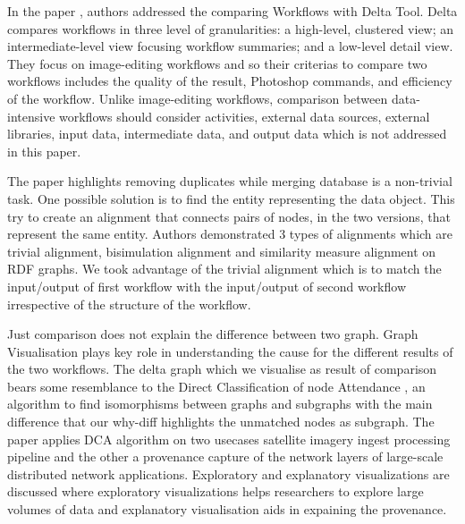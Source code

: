 \documentclass[10pt,conference,twocolumn]{IEEEtran}
\begin{document}
In the paper \cite{Kong2012}, authors addressed the comparing Workflows with Delta Tool. Delta compares workflows in three level of granularities: a high-level, clustered view; an intermediate-level view focusing workflow summaries; and a low-level detail view. They focus on image-editing workflows and so their criterias to compare two workflows includes the quality of the result, Photoshop commands, and efficiency of the workflow. Unlike image-editing workflows, comparison between data-intensive workflows should consider activities, external data sources, external libraries, input data, intermediate data, and output data which is not addressed in this paper.

The paper \cite{Buneman2016} highlights removing duplicates while merging database is a non-trivial task. One possible solution is to find the entity representing the data object. This try to create an alignment that connects pairs of nodes, in the two versions, that represent the same entity. Authors demonstrated 3 types of alignments which are trivial alignment, bisimulation alignment and similarity measure alignment on RDF graphs. We took advantage of the trivial alignment which is to match the input/output of first workflow with the input/output of second workflow irrespective of the structure of the workflow.

Just comparison does not explain the difference between two graph. Graph Visualisation plays key role in understanding the cause for the different results of the two workflows. The delta graph which we visualise as result of comparison bears some resemblance to the Direct Classification of node Attendance \cite{DEPIERO19961031}, an algorithm to find isomorphisms between graphs and subgraphs with the main difference that our why-diff highlights the unmatched nodes as subgraph. The paper applies DCA algorithm on two usecases satellite imagery ingest processing pipeline and the other a provenance capture of the network layers of large-scale distributed network applications. Exploratory and explanatory visualizations are discussed where exploratory visualizations helps researchers to explore large volumes of data and explanatory visualisation aids in expaining the provenance. 
\end{document}

